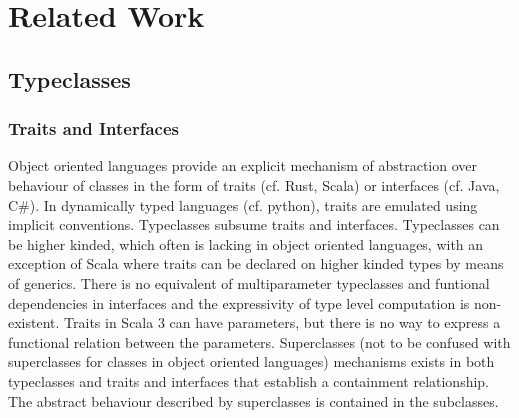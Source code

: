 \documentclass[manuscript,screen,nonacm]{acmart}
\begin{document}
\section{Related Work}
\subsection{Typeclasses}
\subsubsection{Traits and Interfaces}
Object oriented languages provide an explicit mechanism of abstraction over behaviour of classes in the form of traits (cf. Rust, Scala) or interfaces (cf. Java, C\#). In dynamically typed languages (cf. python), traits are emulated using implicit conventions. Typeclasses subsume traits and interfaces. Typeclasses can be higher kinded, which often is lacking in object oriented languages, with an exception of Scala where traits can be declared on higher kinded types by means of generics. There is no equivalent of multiparameter typeclasses and funtional dependencies in interfaces and the expressivity of type level computation is non-existent. Traits in Scala 3 can have parameters, but there is no way to express a functional relation between the parameters. Superclasses (not to be confused with superclasses for classes in object oriented languages)  mechanisms exists in both typeclasses and traits and interfaces that establish a containment relationship. The abstract behaviour described by superclasses is contained in the subclasses.
\end{document}
